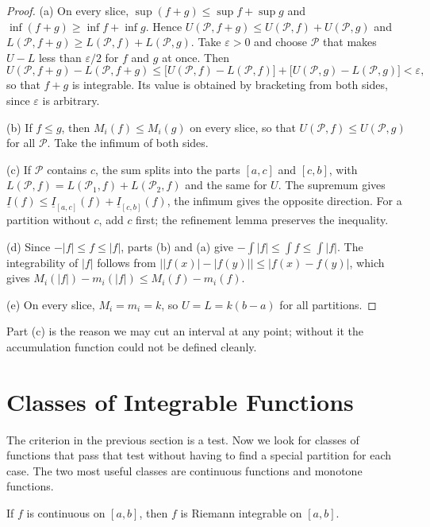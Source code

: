 \begin{proof}
(a) On every slice, $\sup(f+g)\le\sup f+\sup g$ and $\inf(f+g)\ge\inf f+\inf g$.
Hence $U(\mathcal{P},f+g)\le U(\mathcal{P},f)+U(\mathcal{P},g)$ and
$L(\mathcal{P},f+g)\ge L(\mathcal{P},f)+L(\mathcal{P},g)$. Take $\varepsilon>0$ and
choose $\mathcal{P}$ that makes $U-L$ less than $\varepsilon/2$ for $f$ and $g$
at once. Then
\[
U(\mathcal{P},f+g)-L(\mathcal{P},f+g)
\le\bigl[U(\mathcal{P},f)-L(\mathcal{P},f)\bigr]
+\bigl[U(\mathcal{P},g)-L(\mathcal{P},g)\bigr]<\varepsilon ,
\]
so that $f+g$ is integrable. Its value is obtained by bracketing from both sides, since
$\varepsilon$ is arbitrary.

(b) If $f\le g$, then $M_i(f)\le M_i(g)$ on every slice, so that
$U(\mathcal{P},f)\le U(\mathcal{P},g)$ for all $\mathcal{P}$. Take the infimum of both
sides.

(c) If $\mathcal{P}$ contains $c$, the sum splits into the parts $[a,c]$ and
$[c,b]$, with $L(\mathcal{P},f)=L(\mathcal{P}_1,f)+L(\mathcal{P}_2,f)$ and the same
for $U$. The supremum gives
$\underline{I}(f)\le\underline{I}_{[a,c]}(f)+\underline{I}_{[c,b]}(f)$, the infimum
gives the opposite direction. For a partition without $c$, add $c$ first; the
refinement lemma preserves the inequality.

(d) Since $-|f|\le f\le|f|$, parts (b) and (a) give
$-\int|f|\le\int f\le\int|f|$. The integrability of $|f|$ follows from
$\bigl||f(x)|-|f(y)|\bigr|\le|f(x)-f(y)|$, which gives
$M_i(|f|)-m_i(|f|)\le M_i(f)-m_i(f)$.

(e) On every slice, $M_i=m_i=k$, so $U=L=k(b-a)$ for all partitions.
\end{proof}

Part (c) is the reason we may cut an interval at any point; without it the accumulation
function could not be defined cleanly.

\section{Classes of Integrable Functions}

The criterion in the previous section is a test. Now we look for classes of functions that
pass that test without having to find a special partition for each case. The two most
useful classes are continuous functions and monotone functions.

\begin{akibat}
If $f$ is continuous on $[a,b]$, then $f$ is Riemann integrable on $[a,b]$.
\end{akibat}

